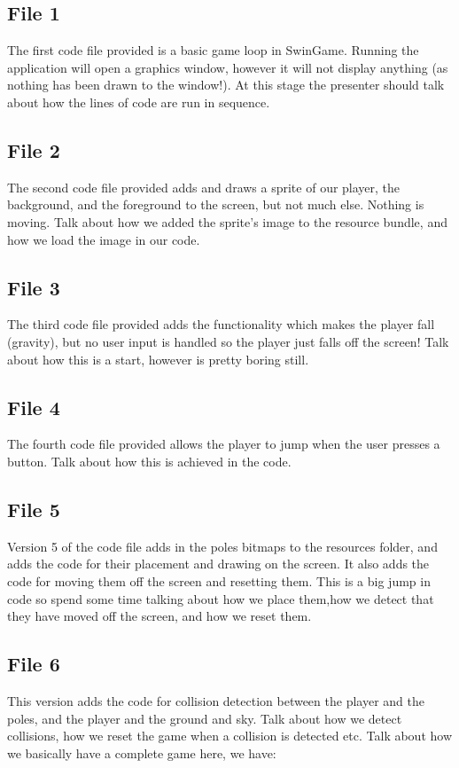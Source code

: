 \documentclass[12pt]{article}
\begin{document}
\subsection*{File 1}
The first code file provided is a basic game loop in SwinGame. Running the application will open a graphics window, however it will not display anything (as nothing has been drawn to the window!).
At this stage the presenter should talk about how the lines of code are run in sequence.

\subsection*{File 2}
The second code file provided adds and draws a sprite of our player, the background, and the foreground to the screen, but not much else. Nothing is moving.
Talk about how we added the sprite's image to the resource bundle, and how we load the image in our code.

\subsection*{File 3}
The third code file provided adds the functionality which makes the player fall (gravity), but no user input is handled so the player just falls off the screen!
Talk about how this is a start, however is pretty boring still.

\subsection*{File 4}
The fourth code file provided allows the player to jump when the user presses a button. Talk about how this is achieved in the code.

\subsection*{File 5}
Version 5 of the code file adds in the poles bitmaps to the resources folder, and adds the code for their placement and drawing on the screen. It also
adds the code for moving them off the screen and resetting them. This is a big jump in code so spend some time talking about how we place them,how
we detect that they have moved off the screen, and how we reset them.
\newpage
\subsection*{File 6}
This version adds the code for collision detection between the player and the poles, and the player and the ground and sky. Talk about how we detect collisions, how we
reset the game when a collision is detected etc. Talk about how we basically have a complete game here, we have:
\end{document}
